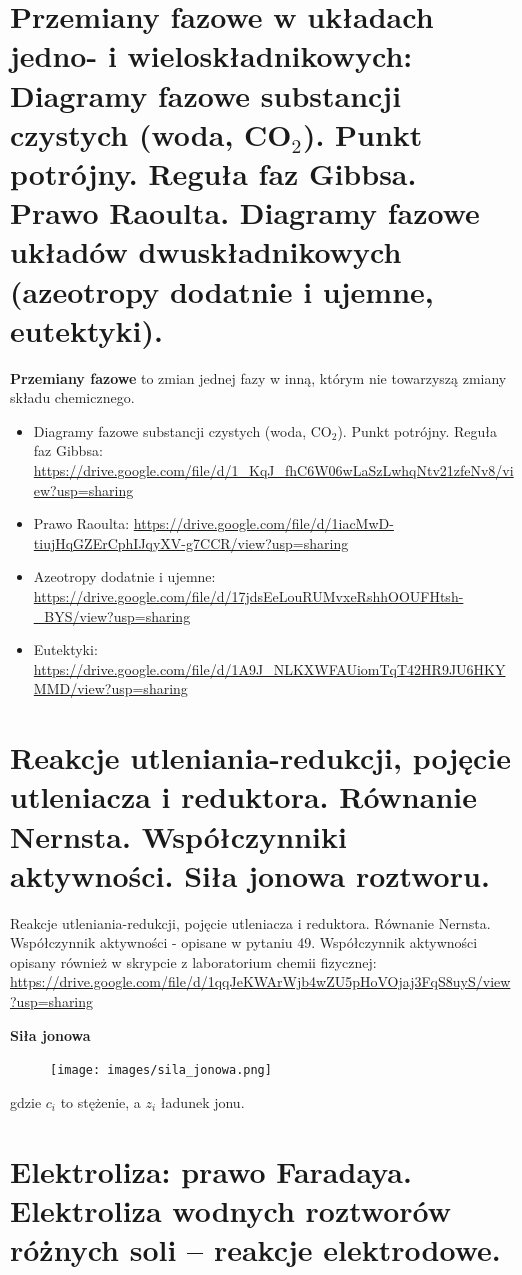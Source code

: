 \documentclass{article}
\begin{document}
\section{Przemiany fazowe w układach jedno- i wieloskładnikowych: Diagramy fazowe substancji czystych (woda, CO$_2$). Punkt potrójny. Reguła faz Gibbsa. Prawo Raoulta. Diagramy fazowe układów dwuskładnikowych (azeotropy dodatnie i ujemne, eutektyki).}
\textbf{Przemiany fazowe} to zmian jednej fazy w inną, którym nie towarzyszą zmiany składu chemicznego.
\begin{itemize}
\item Diagramy fazowe substancji czystych (woda, CO$_2$). Punkt potrójny. Reguła faz Gibbsa: \url{https://drive.google.com/file/d/1_KqJ_fhC6W06wLaSzLwhqNtv21zfeNv8/view?usp=sharing}
\item Prawo Raoulta: \url{https://drive.google.com/file/d/1iacMwD-tiujHqGZErCphIJqyXV-g7CCR/view?usp=sharing}
\item Azeotropy dodatnie i ujemne: \url{https://drive.google.com/file/d/17jdsEeLouRUMvxeRshhOOUFHtsh-_BYS/view?usp=sharing}
\item Eutektyki: \url{https://drive.google.com/file/d/1A9J_NLKXWFAUiomTqT42HR9JU6HKYMMD/view?usp=sharing}
\end{itemize}

\section{Reakcje utleniania-redukcji, pojęcie utleniacza i reduktora. Równanie Nernsta. Współczynniki aktywności. Siła jonowa roztworu.}
Reakcje utleniania-redukcji, pojęcie utleniacza i reduktora. Równanie Nernsta. Współczynnik aktywności - opisane w pytaniu 49.
Współczynnik aktywności opisany również w skrypcie z laboratorium chemii fizycznej: \url{https://drive.google.com/file/d/1qqJeKWArWjb4wZU5pHoVOjaj3FqS8uyS/view?usp=sharing}

\begin{center}
    \textbf{Siła jonowa}
\end{center}
\begin{figure}[H]
    \centering
    \texttt{[image: images/sila\_jonowa.png]}
\end{figure}
gdzie $c_i$ to stężenie, a $z_i$ ładunek jonu.

\section{Elektroliza: prawo Faradaya. Elektroliza wodnych roztworów różnych soli -- reakcje elektrodowe.}
\end{document}
